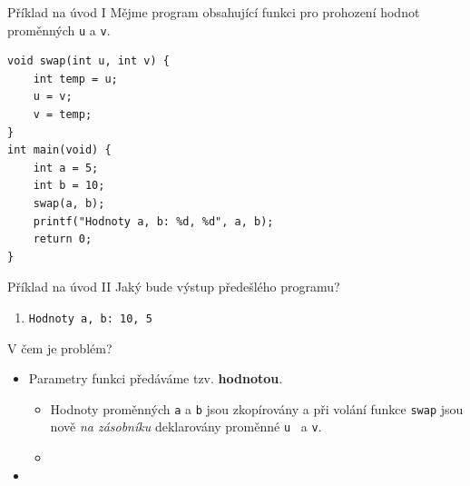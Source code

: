\documentclass[14pt,aspectratio=169]{beamer}
\begin{document}
    \begin{frame}[t,fragile]{Příklad na úvod I}
        Mějme program obsahující funkci pro prohození hodnot proměnných \texttt{u} a \texttt{v}.
        \begin{lstlisting}
void swap(int u, int v) {
    int temp = u;
    u = v;
    v = temp;
}
int main(void) {
    int a = 5;
    int b = 10;
    swap(a, b);
    printf("Hodnoty a, b: %d, %d", a, b);
    return 0;
}
        \end{lstlisting}
    \end{frame}

    \begin{frame}[t]{Příklad na úvod II}
        Jaký bude výstup předešlého programu?
        \begin{enumerate}[label=(\alph*)]
            \item \texttt{Hodnoty a, b: 10, 5}
        \end{enumerate}
    \end{frame}

    \begin{frame}[t]{V čem je problém?}
        \begin{itemize}
            \item Parametry funkci předáváme tzv. \textbf{hodnotou}.
            \begin{itemize}
                \item Hodnoty proměnných \texttt{a} a \texttt{b} jsou zkopírovány a při volání funkce \texttt{swap} jsou nově \emph{na zásobníku} deklarovány proměnné \texttt{u} ~a \texttt{v}.
                \item {}
            \end{itemize}
            \item {}
        \end{itemize}
    \end{frame}
\end{document}
